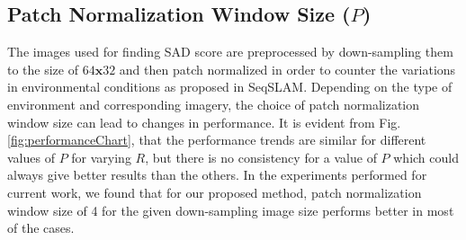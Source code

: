 \documentclass[letterpaper, 10 pt, conference]{ieeeconf}  %
\begin{document}
% 

\subsection{Patch Normalization Window Size ($P$)}
The images used for finding SAD score are preprocessed by down-sampling them to the size of $64\mathbf{x}32$ and then patch normalized in order to counter the variations in environmental conditions as proposed in SeqSLAM. Depending on the type of environment and corresponding imagery, the choice of patch normalization window size can lead to changes in performance. It is evident from Fig.\ref{fig:performanceChart}, that the performance trends are similar for different values of $P$ for varying $R$, but there is no consistency for a value of $P$ which could always give better results than the others. In the experiments performed for current work, we found that for our proposed method, patch normalization window size of 4 for the given down-sampling image size performs better in most of the cases.
\end{document}
